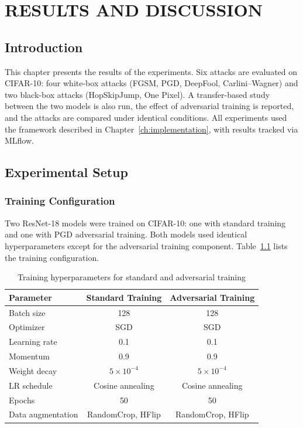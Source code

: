 \chapter{RESULTS AND DISCUSSION}
\label{ch:results}

\section{Introduction}

This chapter presents the results of the experiments. Six attacks are evaluated on CIFAR-10: four white-box attacks (FGSM, PGD, DeepFool, Carlini--Wagner) and two black-box attacks (HopSkipJump, One Pixel). A transfer-based study between the two models is also run, the effect of adversarial training is reported, and the attacks are compared under identical conditions. All experiments used the framework described in Chapter~\ref{ch:implementation}, with results tracked via MLflow.

\section{Experimental Setup}

\subsection{Training Configuration}

Two ResNet-18 models were trained on CIFAR-10: one with standard training and one with PGD adversarial training. Both models used identical hyperparameters except for the adversarial training component. Table~\ref{tab:training_config} lists the training configuration.

\begin{table}[htbp]
    \centering
    \caption{Training hyperparameters for standard and adversarial training}
    \label{tab:training_config}
    \begin{tabular}{lcc}
        \toprule
        \textbf{Parameter} & \textbf{Standard Training} & \textbf{Adversarial Training} \\
        \midrule
        Batch size & 128 & 128 \\
        Optimizer & SGD & SGD \\
        Learning rate & 0.1 & 0.1 \\
        Momentum & 0.9 & 0.9 \\
        Weight decay & $5 \times 10^{-4}$ & $5 \times 10^{-4}$ \\
        LR schedule & Cosine annealing & Cosine annealing \\
        Epochs & 50 & 50 \\
        Data augmentation & RandomCrop, HFlip & RandomCrop, HFlip \\
        \bottomrule
    \end{tabular}
\end{table}

